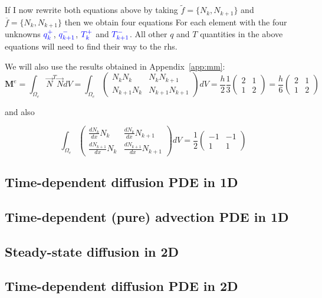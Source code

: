 If I now rewrite both equations above by taking $\tilde{f}=\{N_k,N_{k+1} \}$ and 
$\overline{f}=\{N_k,N_{k+1}\}$ then we obtain four equations  
For each element with the four unknowns ${\color{blue} q_k^+}$, ${\color{blue} q_{k+1}^-}$, 
${\color{blue}T_k^+}$ and ${\color{blue}T_{k+1}^-}$. 
All other $q$ and $T$ quantities in the above equations will need to find their way to the rhs. 

We will also use the results obtained in Appendix~\ref{app:mm}:
\[
{\bm M}^e
=\int_{\Omega_e} \vec{N}^T \vec{N} dV
=\int_{\Omega_e} 
\left(
\begin{array}{cc}
N_k N_k & N_k N_{k+1} \\
N_{k+1} N_k & N_{k+1}N_{k+1}
\end{array}
\right)
dV 
= \frac{h}{2} \frac{1}{3} 
\left(
\begin{array}{cc}
2  & 1 \\
1 & 2
\end{array}
\right)
= 
\frac{h}{6}
\left(
\begin{array}{cc}
2  & 1 \\
1 & 2
\end{array}
\right)
\]

and also 

\[
\int_{\Omega_e} 
\left(
\begin{array}{cc}
\frac{dN_k}{dx} N_k     & \frac{dN_k}{dx} N_{k+1} \\
\frac{dN_{k+1}}{dx} N_k & \frac{dN_{k+1}}{dx} N_{k+1}
\end{array}
\right)
dV
=
\frac{1}{2}
\left(
\begin{array}{cc}
-1  & -1 \\
1 & 1
\end{array}
\right)
\]

\subsection{Time-dependent diffusion PDE in 1D}

\subsection{Time-dependent (pure) advection PDE in 1D}


\subsection{Steady-state diffusion in 2D}

\subsection{Time-dependent diffusion PDE in 2D}






%



